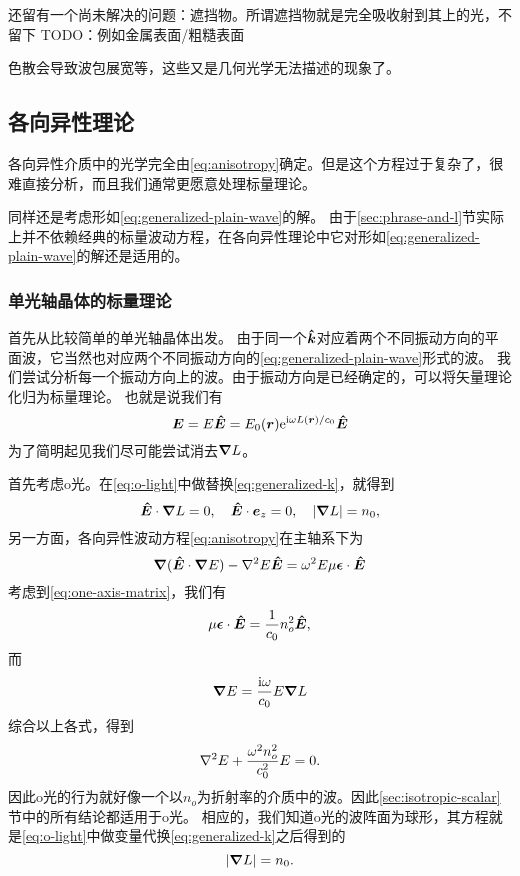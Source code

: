 还留有一个尚未解决的问题：遮挡物。所谓遮挡物就是完全吸收射到其上的光，不留下
TODO：例如金属表面/粗糙表面

色散会导致波包展宽等，这些又是几何光学无法描述的现象了。

\subsection{各向异性理论}

各向异性介质中的光学完全由\eqref{eq:anisotropy}确定。但是这个方程过于复杂了，很难直接分析，而且我们通常更愿意处理标量理论。

同样还是考虑形如\eqref{eq:generalized-plain-wave}的解。
由于\ref{sec:phrase-and-l}节实际上并不依赖经典的标量波动方程，在各向异性理论中它对形如\eqref{eq:generalized-plain-wave}的解还是适用的。

\subsubsection{单光轴晶体的标量理论}

首先从比较简单的单光轴晶体出发。
由于同一个$\vu*{k}$对应着两个不同振动方向的平面波，它当然也对应两个不同振动方向的\eqref{eq:generalized-plain-wave}形式的波。
我们尝试分析每一个振动方向上的波。由于振动方向是已经确定的，可以将矢量理论化归为标量理论。
也就是说我们有
\[
    \vb*{E} = E \vu*{E} = E_0(\vb*{r}) \mathrm{e}^{\mathrm{i} \omega L(\vb*{r}) / c_0} \vu*{E}
\]
为了简明起见我们尽可能尝试消去$\grad{L}$。

首先考虑o光。在\eqref{eq:o-light}中做替换\eqref{eq:generalized-k}，就得到
\[
    \vu*{E} \cdot \grad{L} = 0, \quad \vu*{E} \cdot \vb*{e}_z = 0, \quad \abs{\grad{L}} = n_0,
\]
另一方面，各向异性波动方程\eqref{eq:anisotropy}在主轴系下为
\[
    \grad{(\vu*{E} \cdot \grad{E})} - \laplacian E \vu*{E} = \omega^2 E \mu \vb*{\epsilon} \cdot \vu*{E}
\]
考虑到\eqref{eq:one-axis-matrix}，我们有
\[
    \mu \vb*{\epsilon} \cdot \vu*{E} = \frac{1}{c_0} n_o^2 \vu*{E},
\]
而
\[
    \grad{E} = \frac{\mathrm{i} \omega}{c_0} E \grad{L}
\]
综合以上各式，得到
\begin{equation}
    \laplacian E + \frac{\omega^2 n_o^2}{c_0^2} E = 0.
    \label{eq:o-light-wave-eq}
\end{equation}
因此o光的行为就好像一个以$n_o$为折射率的介质中的波。因此\ref{sec:isotropic-scalar}节中的所有结论都适用于o光。
相应的，我们知道o光的波阵面为球形，其方程就是\eqref{eq:o-light}中做变量代换\eqref{eq:generalized-k}之后得到的
\begin{equation}
    \abs{\grad{L}} = n_0.
\end{equation}

